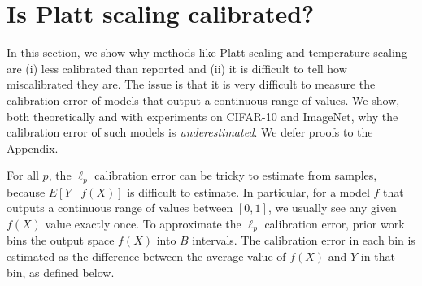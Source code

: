 \section{Is Platt scaling calibrated?}
\label{sec:challenges-measuring}

In this section, we show why methods like Platt scaling and temperature scaling are (i) less calibrated than reported and (ii) it is difficult to tell how miscalibrated they are. The issue is that it is very difficult to measure the calibration error of models that output a continuous range of values. We show, both theoretically and with experiments on CIFAR-10 and ImageNet, why the calibration error of such models is \emph{underestimated}. We defer proofs to the Appendix.





For all $p$, the $\ell_p$ calibration error can be tricky to estimate from samples, because $E[Y \; | \; f(X)]$ is difficult to estimate.
In particular, for a model $f$ that outputs a continuous range of values between $[0, 1]$, we usually see any given $f(X)$ value exactly once.
To approximate the $\ell_p$ calibration error, prior work bins the output space $f(X)$ into $B$ intervals.
The calibration error in each bin is estimated as the difference between the average value of $f(X)$ and $Y$ in that bin, as defined below.

